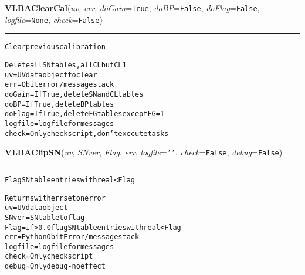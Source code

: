     \label{VLBACal:VLBAClearCal}
    \vspace{0.5ex}

    \begin{boxedminipage}{\textwidth}

    \raggedright \textbf{VLBAClearCal}(\textit{uv}, \textit{err}, \textit{doGain}=\texttt{T\-r\-u\-e\-}, \textit{doBP}=\texttt{F\-a\-l\-s\-e\-}, \textit{doFlag}=\texttt{F\-a\-l\-s\-e\-}, \textit{logfile}=\texttt{N\-o\-n\-e\-}, \textit{check}=\texttt{F\-a\-l\-s\-e\-})

    \vspace{-1.5ex}

    \rule{\textwidth}{0.5\fboxrule}
\begin{alltt}
Clear previous calibration

Delete all SN tables, all CL but CL 1
uv       = UV data object to clear
err      = Obit error/message stack
doGain   = If True, delete SN and CL tables
doBP     = If True, delete BP tables
doFlag   = If True, delete FG tables except FG=1
logfile  = logfile for messages
check    = Only check script, don't execute tasks\end{alltt}

    \vspace{1ex}

    \end{boxedminipage}

    \label{VLBACal:VLBAClipSN}
    \vspace{0.5ex}

    \begin{boxedminipage}{\textwidth}

    \raggedright \textbf{VLBAClipSN}(\textit{uv}, \textit{SNver}, \textit{Flag}, \textit{err}, \textit{logfile}=\texttt{'\-'\-}, \textit{check}=\texttt{F\-a\-l\-s\-e\-}, \textit{debug}=\texttt{F\-a\-l\-s\-e\-})

    \vspace{-1.5ex}

    \rule{\textwidth}{0.5\fboxrule}
\begin{alltt}
Flag SN table entries with real {\textless} Flag

Returns with err set on error
uv         = UV data object
SNver      = SN table to flag
Flag       = if {\textgreater}0.0 flag SN table entries with real{\textless}Flag
err        = Python Obit Error/message stack
logfile    = logfile for messages
check      = Only check script
debug      = Only debug - no effect\end{alltt}

    \vspace{1ex}

    \end{boxedminipage}

